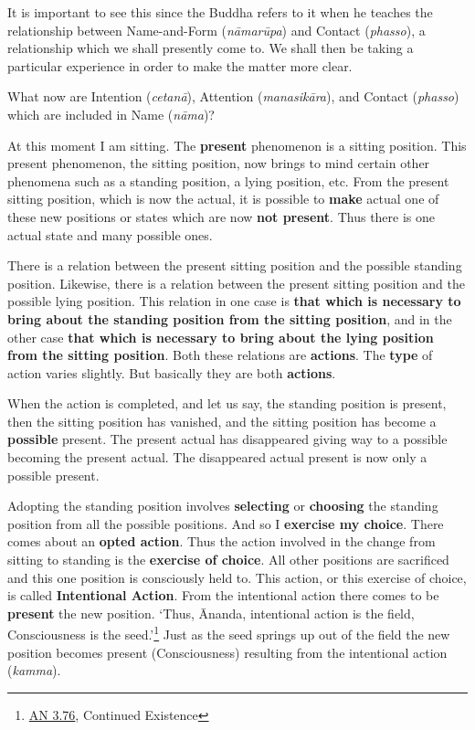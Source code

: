 It is important to see this since the Buddha refers to it when he teaches the relationship between Name-and-Form (\emph{nāmarūpa}) and Contact (\emph{phasso}), a relationship which we shall presently come to. We shall then be taking a particular experience in order to make the matter more clear.

What now are Intention (\emph{cetanā}), Attention (\emph{manasikāra}), and Contact (\emph{phasso}) which are included in Name (\emph{nāma})?

At this moment I am sitting. The \textbf{present} phenomenon is a sitting position. This present phenomenon, the sitting position, now brings to mind certain other phenomena such as a standing position, a lying position, etc. From the present sitting position, which is now the actual, it is possible to \textbf{make} actual one of these new positions or states which are now \textbf{not present}. Thus there is one actual state and many possible ones.

There is a relation between the present sitting position and the possible standing position. Likewise, there is a relation between the present sitting position and the possible lying position. This relation in one case is \textbf{that which is necessary to bring about the standing position from the sitting position}, and in the other case \textbf{that which is necessary to bring about the lying position from the sitting position}. Both these relations are \textbf{actions}. The \textbf{type} of action varies slightly. But basically they are both \textbf{actions}.

When the action is completed, and let us say, the standing position is present, then the sitting position has vanished, and the sitting position has become a \textbf{possible} present. The present actual has disappeared giving way to a possible becoming the present actual. The disappeared actual present is now only a possible present.

Adopting the standing position involves \textbf{selecting} or \textbf{choosing} the standing position from all the possible positions. And so I \textbf{exercise my choice}. There comes about an \textbf{opted action}. Thus the action involved in the change from sitting to standing is the \textbf{exercise of choice}. All other positions are sacrificed and this one position is consciously held to. This action, or this exercise of choice, is called \textbf{Intentional Action}. From the intentional action there comes to be \textbf{present} the new position. `Thus, Ānanda, intentional action is the field, Consciousness is the seed.'\footnote{\href{https://suttacentral.net/an3.76/en/thanissaro}{AN 3.76}, Continued Existence} Just as the seed springs up out of the field the new position becomes present (Consciousness) resulting from the intentional action (\emph{kamma}).

